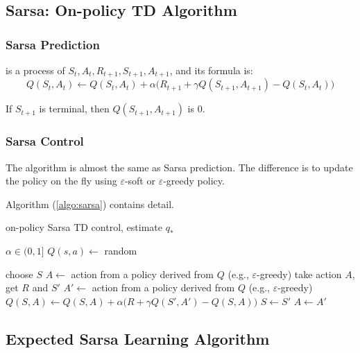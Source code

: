 \subsection{Sarsa: On-policy TD Algorithm}

\subsubsection{Sarsa Prediction}

 is a process of $S_t,A_t,R_{t+1},S_{t+1},A_{t+1}$, and its formula is:
\begin{equation}
	Q(S_t,A_t) \gets Q(S_t,A_t) + \alpha \Big ( R_{t+1} + \gamma Q(S_{t+1},A_{t+1}) - Q(S_t,A_t) \Big )
\end{equation}

If $S_{t+1}$ is terminal, then $Q(S_{t+1},A_{t+1})$ is $0$.

\subsubsection{Sarsa Control}

The algorithm is almost the same as Sarsa prediction. The difference is to update the policy on the fly using $\varepsilon$-soft or $\varepsilon$-greedy policy.

Algorithm (\ref{algo:sarsa}) contains detail.

\begin{algorithm}
	\caption{on-policy Sarsa TD control, estimate $q_*$}\label{algo:sarsa}	
	
	\begin{algorithmic}[1]
		\State $ \alpha \in (0,1]$
		\State $Q(s,a) \gets$ random
		
		\Statex
		
		\Loop
			\State choose $S$
			\State $A \gets$ action from a policy derived from $Q$ (e.g., $\varepsilon$-greedy) 
			\Repeat
				\State take action $A$, get $R$ and $S'$
				\State {}
				\State $A' \gets$ action from a policy derived from $Q$ (e.g., $\varepsilon$-greedy) 
				\State $Q(S,A) \gets Q(S,A) + \alpha \Big (R + \gamma Q(S',A') - Q(S,A) \Big )$
				\State $S \gets S'$
				\State $A \gets A'$
		\EndLoop		
	\end{algorithmic}
\end{algorithm}



\subsection{Expected Sarsa Learning Algorithm}

